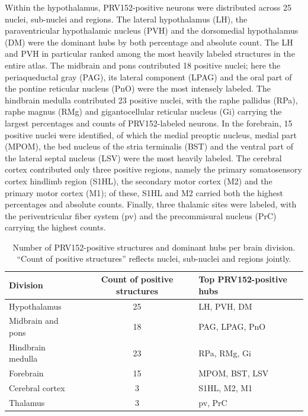 \documentclass[11pt]{article}
\begin{document}
Within the hypothalamus, PRV152-positive neurons were distributed across 25 nuclei, sub-nuclei and regions. The lateral hypothalamus (LH), the paraventricular hypothalamic nucleus (PVH) and the dorsomedial hypothalamus (DM) were the dominant hubs by both percentage and absolute count. The LH and PVH in particular ranked among the most heavily labeled structures in the entire atlas. The midbrain and pons contributed 18 positive nuclei; here the periaqueductal gray (PAG), its lateral component (LPAG) and the oral part of the pontine reticular nucleus (PnO) were the most intensely labeled. The hindbrain medulla contributed 23 positive nuclei, with the raphe pallidus (RPa), raphe magnus (RMg) and gigantocellular reticular nucleus (Gi) carrying the largest percentages and counts of PRV152-labeled neurons. In the forebrain, 15 positive nuclei were identified, of which the medial preoptic nucleus, medial part (MPOM), the bed nucleus of the stria terminalis (BST) and the ventral part of the lateral septal nucleus (LSV) were the most heavily labeled. The cerebral cortex contributed only three positive regions, namely the primary somatosensory cortex hindlimb region (S1HL), the secondary motor cortex (M2) and the primary motor cortex (M1); of these, S1HL and M2 carried both the highest percentages and absolute counts. Finally, three thalamic sites were labeled, with the periventricular fiber system (pv) and the precommisural nucleus (PrC) carrying the highest counts.

\begin{table}[htbp]
\centering
\caption{Number of PRV152-positive structures and dominant hubs per brain division. ``Count of positive structures'' reflects nuclei, sub-nuclei and regions jointly.}
\label{tab:hotspots}
\begin{tabular}{lcl}
\toprule
Division & Count of positive structures & Top PRV152-positive hubs \\
\midrule
Hypothalamus & 25 & LH, PVH, DM \\
Midbrain and pons & 18 & PAG, LPAG, PnO \\
Hindbrain medulla & 23 & RPa, RMg, Gi \\
Forebrain & 15 & MPOM, BST, LSV \\
Cerebral cortex & 3 & S1HL, M2, M1 \\
Thalamus & 3 & pv, PrC \\
\bottomrule
\end{tabular}
\end{table}
\end{document}
